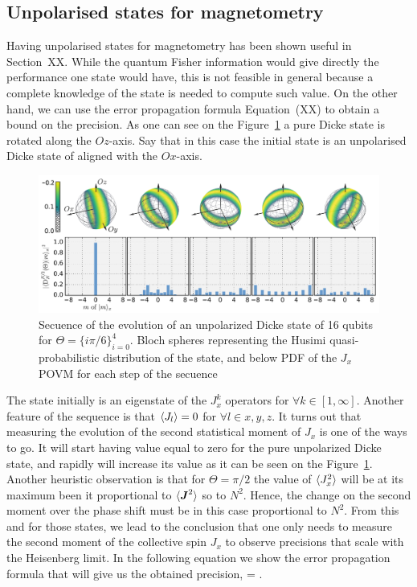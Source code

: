 \subsection{Unpolarised states for magnetometry}

Having unpolarised states for magnetometry has been shown useful in Section~XX.
While the quantum Fisher information would give directly the performance one state would have, this is not feasible in general because a complete knowledge of the state is needed to compute such value.
On the other hand, we can use the error propagation formula Equation~(XX) to obtain a bound on the precision.
As one can see on the Figure~\ref{fig:vd-secuence-evo} a pure Dicke state is rotated along the $Oz$-axis.
Say that in this case the initial state is an unpolarised Dicke state of aligned with the $Ox$-axis.
\begin{figure}
  \centering
  \includegraphics[scale=.65]{img/plots/VD_evolution_of_dicke.pdf}
  \caption{Secuence of the evolution of an unpolarized Dicke state of 16 qubits for $\Theta=\{i\pi/6\}_{i=0}^4$. Bloch spheres representing the Husimi quasi-probabilistic distribution of the state, and below PDF of the $J_x$ POVM for each step of the secuence}
  \label{fig:vd-secuence-evo}
\end{figure}

The state initially is an eigenstate of the $J_x^k$ operators for $\forall k \in [1,\infty]$.
Another feature of the sequence is that $\langle J_l \rangle=0$ for $\forall l\in x,y,z$.
It turns out that measuring the evolution of the second statistical moment of $J_x$ is one of the ways to go.
It will start having value equal to zero for the pure unpolarized Dicke state, and rapidly will increase its value as it can be seen on the Figure~\ref{fig:vd-secuence-evo}.
Another heuristic observation is that for $\Theta=\pi/2$ the value of $\langle J_x^2 \rangle$ will be at its maximum been it proportional to $\langle \boldsymbol{J}^2 \rangle$ so to $N^2$.
Hence, the change on the second moment over the phase shift must be in this case proportional to $N^2$.
From this and for those states, we lead to the conclusion that one only needs to measure the second moment of the collective spin $J_x$ to observe precisions that scale with the Heisenberg limit.
In the following equation we show the error propagation formula that will give us the obtained precision,
\be
  \varian{\Theta} = .
  \label{eq:vd-error-propagation}
\ee

